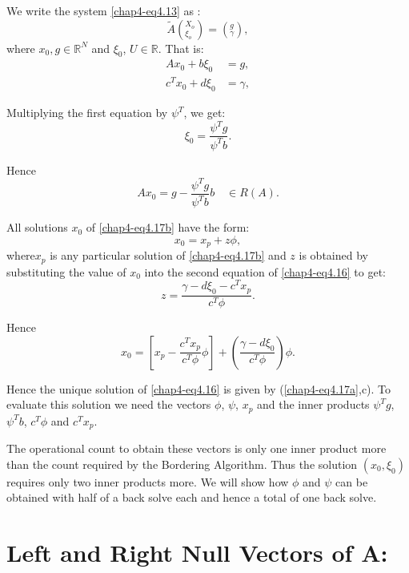 We write the system \eqref{chap4-eq4.13} as :
$$
\widetilde {A}({^{X_{o}}_{\xi _{o}}})= (^g_\gamma), 
$$
where $x_0, g \in  \mathbb{R}^N$ and $\xi_0$, $U \in
\mathbb{R}$. That is: 
\begin{equation*}
\begin{split}
Ax_0 + b \xi_0 &= g,\\
c^T x_0 + d\xi _0& = \gamma, 
\end{split}\tag{4.16}\label{chap4-eq4.16}
\end{equation*}

Multiplying the first equation by $\psi ^T$, we get: 
\begin{equation*}
\xi _0 = \frac{\psi ^T g}{\psi ^T b}. \tag{4.17a}\label{chap4-eq4.17a}  
\end{equation*}

Hence 
\begin{equation*}
Ax_0 = g - \frac{\psi^T g}{\psi^T b} b \quad \in
R(A). \tag{4.17b}\label{chap4-eq4.17b}  
\end{equation*}

All solutions $x_0$ of \eqref{chap4-eq4.17b} have the form:
$$
x_0 = x_p + z \phi,
$$
where\pageoriginale $x_p$ is any particular solution of
\eqref{chap4-eq4.17b} and $z$ is 
obtained by substituting the value of $x_0$ into the second equation
of \eqref{chap4-eq4.16}  to get: 
$$
 z=\frac{\gamma - d \xi _0 - c^T x_p}{c^T \phi}. 
$$

Hence
\begin{equation*}
x_0= \left[x_p- \frac{c^T x_p}{c^T \phi }\phi  \right]+
\left(\frac{\gamma-d \xi 
  _0}{c^T \phi } \right)\phi. \tag{4.17c} \label{chap4-eq4.17c} 
\end{equation*}

Hence the unique solution of \eqref{chap4-eq4.16} is given  by
(\ref{chap4-eq4.17a},c). To 
evaluate this solution we need the  vectors $\phi$, $\psi$, $x_p$ and the
inner products $\psi^T g$, $\psi ^Tb$, $c^T \phi$ and $ c^T x_p$. 

The operational count to obtain these vectors is only one inner
product more than the count required by the Bordering Algorithm. Thus
the solution $( x_0, \xi_0)$ requires only two inner products more. We
will show how $\phi$ and $\psi$ can be obtained with half of a back
solve each and hence a total of one back solve.		 

\section*{Left and Right Null Vectors of A:}

